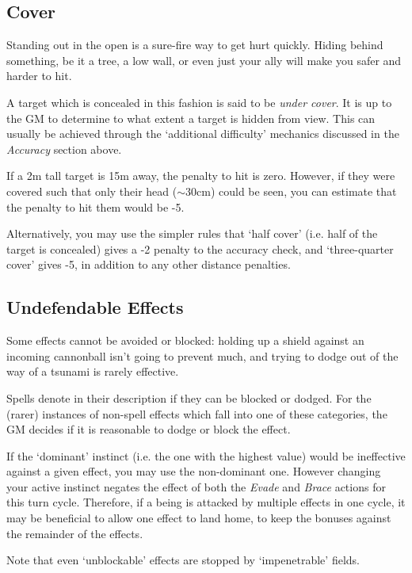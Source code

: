 \subsection{Cover}

Standing out in the open is a sure-fire way to get hurt quickly. Hiding behind something, be it a tree, a low wall, or even just your ally will make you safer and harder to hit. 

A target which is concealed in this fashion is said to be {\it under cover}. It is up to the GM to determine to what extent a target is hidden from view. This can usually be achieved through the `additional difficulty' mechanics discussed in the {\it Accuracy} section above. 

If a 2m tall target is 15m away, the penalty to hit is zero. However, if they were covered such that only their head ($\sim 30$cm) could be seen, you can estimate that the penalty to hit them would be -5.

Alternatively, you may use the simpler rules that `half cover' (i.e. half of the target is concealed) gives a -2 penalty to the accuracy check, and `three-quarter cover' gives -5, in addition to any other distance penalties. 

\subsection{Undefendable Effects}

Some effects cannot be avoided or blocked: holding up a shield against an incoming cannonball isn't going to prevent much, and trying to dodge out of the way of a tsunami is rarely effective. 

Spells denote in their description if they can be blocked or dodged. For the (rarer) instances of non-spell effects which fall into one of these categories, the GM decides if it is reasonable to dodge or block the effect. 

If the `dominant' instinct (i.e. the one with the highest value) would be ineffective against a given effect, you may use the non-dominant one. However changing your active instinct negates the effect of both the {\it Evade} and {\it Brace} actions for this turn cycle. Therefore, if a being is attacked by multiple effects in one cycle, it may be beneficial to allow one effect to land home, to keep the bonuses against the remainder of the effects. 

Note that even `unblockable' effects are stopped by `impenetrable' fields. 


